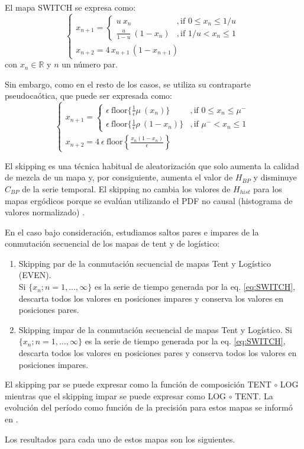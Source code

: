 El mapa SWITCH se expresa como:
%
\begin{equation}\label{eq:SWITCH}
\begin{cases}
x_{n+1}=
\begin{cases}
u~x_n &, \textrm{if } 0\leq x_n\leq 1/u\\
\frac{u}{1-u}~(1-x_n) &, \textrm{if } 1/u< x_n\leq 1 
\end{cases} \\
x_{n+2}=4\,x_{n+1}\,(1-x_{n+1})
\end{cases}
\end{equation}
%
con $x_n \in \mathbb{R}$ y $n$ un número par.

Sin embargo, como en el resto de los casos, se utiliza su contraparte pseudocaótica, que puede ser expresada como:
%
\begin{equation}\label{eq:SWITCHB2}
\begin{cases}
x_{n+1}=
\begin{cases}
\epsilon ~\text{floor} \{\frac{1}{\epsilon} \mu~(x_n)\} &, \textrm{if } 0\leq x_n\leq \mu^-\\
\epsilon ~\text{floor} \{\frac{1}{\epsilon} \rho~(1-x_n)\} &, \textrm{if } \mu^-<x_n\leq 1
\end{cases} \\
x_{n+2}=4 ~\epsilon ~\text{floor}\left\{\frac{x_n(1-x_n)}{\epsilon}\right\}
\end{cases}
\end{equation}

El skipping es una técnica habitual de aleatorización que solo aumenta la calidad de mezcla de un mapa y, por consiguiente, aumenta el valor de $H_{BP}$ y disminuye $C_{BP}$ de la serie temporal.
El skipping no cambia los valores de $H_{hist}$ para los mapas ergódicos porque se evalúan utilizando el PDF no causal (histograma de valores normalizado) \cite{DeMicco2008}.

En el caso bajo consideración, estudiamos saltos pares e impares de la conmutación secuencial de los mapas de tent y de logístico:
\begin{enumerate}
	\item Skipping par de la conmutación secuencial de mapas Tent y Logístico (EVEN). \\
	Si $\{x_n; n = 1, \dots, \infty \}$ es la serie de tiempo generada por la eq. \ref{eq:SWITCH}, descarta todos los valores en posiciones impares y conserva los valores en posiciones pares.
	\item Skipping impar de la conmutación secuencial de mapas Tent y Logístico.
	Si $\{x_n; n = 1, \dots, \infty \}$ es la serie de tiempo generada por la eq. \ref{eq:SWITCH}, descarta todos los valores en posiciones pares y conserva todos los valores en posiciones impares.
\end{enumerate}

El skipping par se puede expresar como la función de composición TENT $\circ$ LOG mientras que el skipping impar se puede expresar como LOG $\circ$ TENT.
La evolución del período como función de la precisión para estos mapas se informó en \cite{Nagaraj2008}.

Los resultados para cada uno de estos mapas son los siguientes.